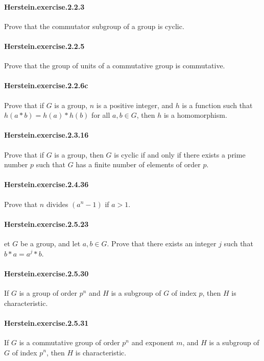 \documentclass{article}
\begin{document}
\paragraph{Herstein.exercise.2.2.3} Prove that the commutator subgroup of a group is cyclic.

\paragraph{Herstein.exercise.2.2.5} Prove that the group of units of a commutative group is commutative.

\paragraph{Herstein.exercise.2.2.6c} Prove that if $G$ is a group, $n$ is a positive integer, and $h$ is a function such that $h(a * b) = h(a) * h(b)$ for all $a, b \in G$, then $h$ is a homomorphism.

\paragraph{Herstein.exercise.2.3.16} Prove that if $G$ is a group, then $G$ is cyclic if and only if there exists a prime number $p$ such that $G$ has a finite number of elements of order $p$.

\paragraph{Herstein.exercise.2.4.36} Prove that $n$ divides $(a^n-1)$ if $a>1$.

\paragraph{Herstein.exercise.2.5.23} et $G$ be a group, and let $a, b \in G$. Prove that there exists an integer $j$ such that $b*a = a^j*b$.

\paragraph{Herstein.exercise.2.5.30} If $G$ is a group of order $p^n$ and $H$ is a subgroup of $G$ of index $p$, then $H$ is characteristic.

\paragraph{Herstein.exercise.2.5.31} If $G$ is a commutative group of order $p^n$ and exponent $m$, and $H$ is a subgroup of $G$ of index $p^n$, then $H$ is characteristic.
\end{document}
